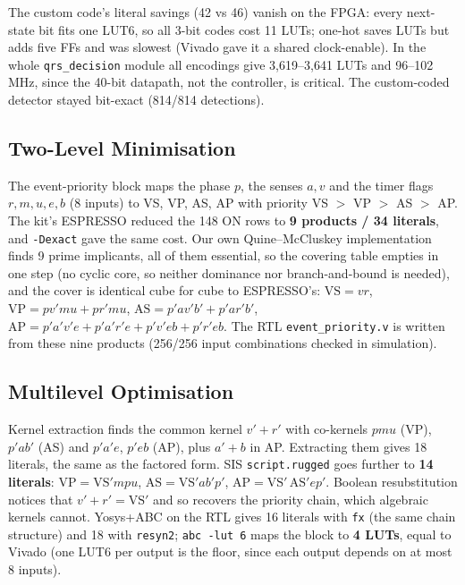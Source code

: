 \documentclass[11pt,a4paper]{article}
\begin{document}
The custom code's literal savings (42 vs 46) vanish on the FPGA: every next-state bit fits one LUT6,
so all 3-bit codes cost 11 LUTs; one-hot saves LUTs but adds five FFs and was slowest (Vivado gave it a
shared clock-enable). In the whole \texttt{qrs\_decision} module all encodings give 3{,}619--3{,}641
LUTs and 96--102\,MHz, since the 40-bit datapath, not the controller, is critical. The custom-coded
detector stayed bit-exact (814/814 detections).

\subsection{Two-Level Minimisation}
The event-priority block maps the phase $p$, the senses $a, v$ and the timer flags
$r, m, u, e, b$ (8 inputs) to VS, VP, AS, AP with priority VS $>$ VP $>$ AS $>$ AP. The kit's
ESPRESSO reduced the 148 ON rows to \textbf{9 products / 34 literals}, and \texttt{-Dexact} gave the
same cost. Our own Quine--McCluskey implementation finds 9 prime implicants, all of them essential,
so the covering table empties in one step (no cyclic core, so neither dominance nor branch-and-bound
is needed), and the cover is identical cube for cube to ESPRESSO's:
$\mathrm{VS}=vr$, $\mathrm{VP}=pv'mu+pr'mu$, $\mathrm{AS}=p'av'b'+p'ar'b'$,
$\mathrm{AP}=p'a'v'e+p'a'r'e+p'v'eb+p'r'eb$. The RTL \texttt{event\_priority.v} is written from these
nine products (256/256 input combinations checked in simulation).

\subsection{Multilevel Optimisation}
Kernel extraction finds the common kernel $v'+r'$ with co-kernels $pmu$ (VP), $p'ab'$ (AS) and
$p'a'e$, $p'eb$ (AP), plus $a'+b$ in AP. Extracting them gives 18 literals, the same as the
factored form. SIS \texttt{script.rugged} goes further to \textbf{14 literals}:
$\mathrm{VP}=\mathrm{VS}'mpu$, $\mathrm{AS}=\mathrm{VS}'ab'p'$, $\mathrm{AP}=\mathrm{VS}'\,\mathrm{AS}'ep'$.
Boolean resubstitution notices that $v'+r'=\mathrm{VS}'$ and so recovers the priority chain, which
algebraic kernels cannot. Yosys+ABC on the RTL gives 16 literals with \texttt{fx} (the same chain
structure) and 18 with \texttt{resyn2}; \texttt{abc -lut 6} maps the block to \textbf{4 LUTs},
equal to Vivado (one LUT6 per output is the floor, since each output depends on at most 8 inputs).

\end{document}
